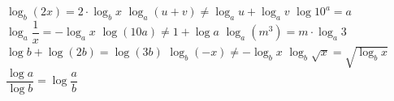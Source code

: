 \begin{questions}
\begin{parts}
	\end{parts}

	\question

	
	\begin{checkboxes}
		\choice $\log_b (2x) = 2 \cdot \log_b x$
		\correctchoice $\log_a(u+v) \neq  \log_a u + \log_a v$
		\correctchoice $\log 10^a =a$
		\correctchoice $\log_a \dfrac{1}{x}=-\log_a x$
		\choice $\log(10a) \neq 1 + \log a$
		\choice $\log_a(m^3) = m \cdot \log_a 3$
		\choice $\log b + \log (2b) = \log (3b)$
		\correctchoice $\log_b(-x) \neq - \log_b x$
		\choice $\log_b \sqrt{x} = \sqrt{\log_b x}$
		\choice $\dfrac{\log a}{\log b}= \log \dfrac{a}{b}$
	\end{checkboxes}
	






	\exnewpage
	\question






\end{questions}
